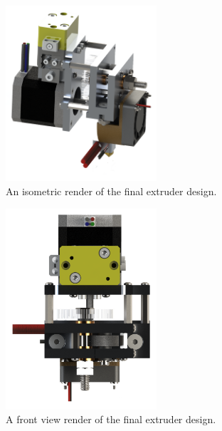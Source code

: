\begin{figure}[htp]
\centering
\includegraphics[width=0.5\textwidth]{./figures/extruder-iso}
\caption{An isometric render of the final extruder design.}
\label{fig:flowchart}
\end{figure}

\begin{figure}[htp]
\centering
\includegraphics[width=0.5\textwidth]{./figures/extruder-top}
\caption{A front view render of the final extruder design.}
\label{fig:flowchart}
\end{figure}

